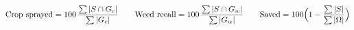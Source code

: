 \documentclass[varwidth=26cm,border=10pt]{standalone}
\begin{document}
\Large
$$\text{Crop sprayed}=100\,\frac{\sum|S\cap G_c|}{\sum|G_c|}\qquad
\text{Weed recall}=100\,\frac{\sum|S\cap G_w|}{\sum|G_w|}\qquad
\text{Saved}=100\Bigl(1-\frac{\sum|S|}{\sum|\Omega|}\Bigr)$$
\end{document}
